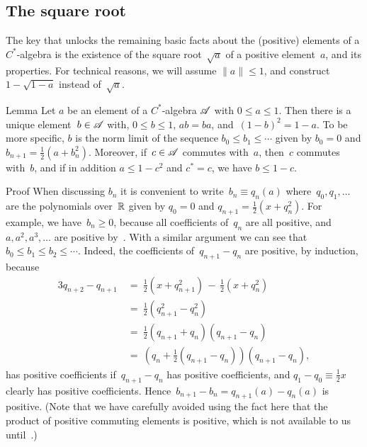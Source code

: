 \documentclass[a]{subfiles}
\begin{document}
\subsection{The square root}
\begin{parsec}%
\begin{point}%
The key that unlocks the remaining basic facts 
about the (positive) elements of a  $C^*$-algebra
is the existence of the square root~$\sqrt{a}$ of a positive element~$a$,
and its properties.
For technical reasons,
we will assume $\|a\|\leq 1$,
and construct
 $1-\sqrt{1-a}$ instead of~$\sqrt{a}$.
\end{point}
\begin{point}{Lemma}%
Let $a$ be an element of a $C^*$-algebra $\mathscr{A}$
with $0\leq a\leq 1$.
Then there is a unique element~$b\in\mathscr{A}$ 
with, $0\leq b\leq 1$,
$ab=ba$,
and~$(1-b)^2 = 1-a$.
To be more specific,
$b$ is the norm limit of
the sequence $b_0\leq b_1\leq \dotsb$
given by $b_0=0$ and $b_{n+1} = \frac{1}{2}(a+b_n^2)$.
Moreover,
if~$c\in\mathscr{A}$ commutes with~$a$, then~$c$ commutes with~$b$,
and if in addition $a\leq 1-c^2$ and $c^*=c$,
we have $b\leq 1-c$.
\begin{point}{Proof}%
When discussing $b_n$ it 
is convenient to write~$b_n \equiv q_n(a)$
where~$q_0,q_1,\dotsc$ are the polynomials over~$\mathbb{R}$ given by
$q_0=0$ and $q_{n+1}=\frac{1}{2}(x + q_n^2)$.
For example,
we have~$b_n\geq 0$, 
because all coefficients of~$q_n$ are all positive,
and $a,a^2,a^3,\dotsc$ are positive by~.
With a similar argument we can see that
 $b_0 \leq b_1\leq b_2\leq \dotsb$.
Indeed, 
the coefficients of~$q_{n+1}-q_n$
are positive,
by induction,
because
\begin{alignat*}{3}
q_{n+2}-q_{n+1} \ &=\ \textstyle \frac{1}{2}(x+ q_{n+1}^2)
\,-\, \textstyle\frac{1}{2}(x+q_n^2) \\
&=\ \textstyle\frac{1}{2}(q_{n+1}^2- q_n^2) \\
&=\ \textstyle\frac{1}{2}(q_{n+1}+q_n)(q_{n+1}-q_n) \\
&=\ (q_n+\textstyle\frac{1}{2}(q_{n+1}-q_n))(q_{n+1}-q_n),
\end{alignat*}
has positive coefficients
if~$q_{n+1}-q_n$ has positive coefficients,
and $q_1-q_0\equiv \frac{1}{2}x$ clearly has positive coefficients.
Hence~$b_{n+1}-b_{n} = q_{n+1}(a)- q_n(a)$ is positive.
(Note that we have carefully avoided
using the fact here that the product of positive 
commuting elements is positive,
which is not available to us until~.)


\end{point}
\end{point}
\end{parsec}
\end{document}
